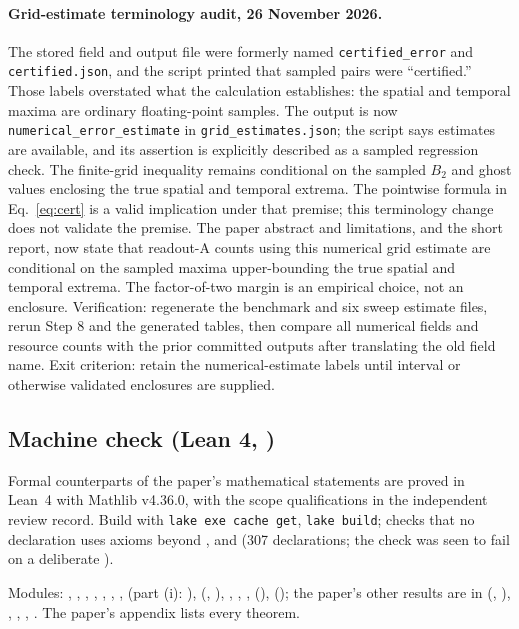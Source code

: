 \documentclass[11pt,a4paper]{article}
\begin{document}
\paragraph{Grid-estimate terminology audit, 26 November 2026.}
The stored field and output file were formerly named \texttt{certified\_error} and
\texttt{certified.json}, and the script printed that sampled pairs were
``certified.'' Those labels overstated what the calculation establishes: the
spatial and temporal maxima are ordinary floating-point samples. The output is
now \texttt{numerical\_error\_estimate} in \texttt{grid\_estimates.json}; the
script says estimates are available, and its assertion is explicitly described
as a sampled regression check. The finite-grid inequality remains conditional
on the sampled $B_2$ and ghost values enclosing the true spatial and temporal
extrema. The pointwise formula in Eq.~\eqref{eq:cert} is a valid implication
under that premise; this terminology change does not validate the premise.
The paper abstract and limitations, and the short report, now state that
readout-A counts using this numerical grid estimate are conditional on the
sampled maxima upper-bounding the true spatial and temporal extrema. The
factor-of-two margin is an empirical choice, not an enclosure.
Verification: regenerate the benchmark and six sweep estimate files, rerun
Step 8 and the generated tables, then compare all numerical fields and resource
counts with the prior committed outputs after translating the old field name.
Exit criterion: retain the numerical-estimate labels until interval or otherwise
validated enclosures are supplied.

\subsection*{Machine check (Lean 4, )}

Formal counterparts of the paper's mathematical statements are proved in
Lean~4 with Mathlib v4.36.0, with the scope qualifications in the independent
review record. Build with
\texttt{lake exe cache get}, \texttt{lake build};  checks that no
declaration uses axioms beyond ,  and 
(307 declarations; the check was seen to fail on a deliberate ).

\begin{sloppypar}
Modules: , , , ,
, , ,  (part (i):
),  (, ), ,
, ,  (), 
(); the paper's other results are in 
(, ), , , , .
The paper's appendix lists every theorem.
\end{sloppypar}
\end{document}
